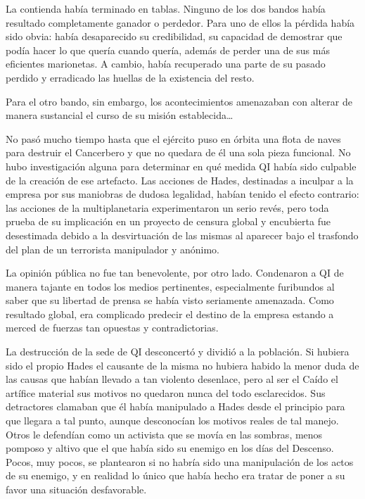 La contienda había terminado en tablas. Ninguno de los dos bandos había resultado completamente ganador o perdedor. Para uno de ellos la pérdida había sido obvia: había desaparecido su credibilidad, su capacidad de demostrar que podía hacer lo que quería cuando quería, además de perder una de sus más eficientes marionetas. A cambio, había recuperado una parte de su pasado perdido y erradicado las huellas de la existencia del resto.

Para el otro bando, sin embargo, los acontecimientos amenazaban con alterar de manera sustancial el curso de su misión establecida\dots

\fancyparbreak
No pasó mucho tiempo hasta que el ejército puso en órbita una flota de naves para destruir el Cancerbero y que no quedara de él una sola pieza funcional. No hubo investigación alguna para determinar en qué medida QI había sido culpable de la creación de ese artefacto. Las acciones de Hades, destinadas a inculpar a la empresa por sus maniobras de dudosa legalidad, habían tenido el efecto contrario: las acciones de la multiplanetaria experimentaron un serio revés, pero toda prueba de su implicación en un proyecto de censura global y encubierta fue desestimada debido a la desvirtuación de las mismas al aparecer bajo el trasfondo del plan de un terrorista manipulador y anónimo.

La opinión pública no fue tan benevolente, por otro lado. Condenaron a QI de manera tajante en todos los medios pertinentes, especialmente furibundos al saber que su libertad de prensa se había visto seriamente amenazada. Como resultado global, era complicado predecir el destino de la empresa estando a merced de fuerzas tan opuestas y contradictorias.

La destrucción de la sede de QI desconcertó y dividió a la población. Si hubiera sido el propio Hades el causante de la misma no hubiera habido la menor duda de las causas que habían llevado a tan violento desenlace, pero al ser el Caído el artífice material sus motivos no quedaron nunca del todo esclarecidos. Sus detractores clamaban que él había manipulado a Hades desde el principio para que llegara a tal punto, aunque desconocían los motivos reales de tal manejo. Otros le defendían como un activista que se movía en las sombras, menos pomposo y altivo que el que había sido su enemigo en los días del Descenso. Pocos, muy pocos, se plantearon si no habría sido una manipulación de los actos de su enemigo, y en realidad lo único que había hecho era tratar de poner a su favor una situación desfavorable.

